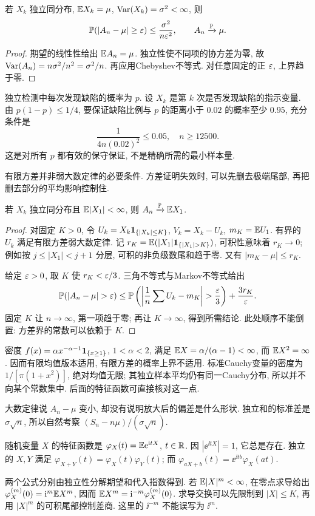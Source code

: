 \begin{theorem}[有限方差弱大数定律]
若 $X_k$ 独立同分布, $\mathbb E X_k=\mu$, $\operatorname{Var}(X_k)=\sigma^2<\infty$, 则
\[\mathbb P(|A_n-\mu|\geq\varepsilon)\leq\frac{\sigma^2}{n\varepsilon^2},\qquad A_n\xrightarrow{\mathbb P}\mu.\]
\end{theorem}
\begin{proof}
期望的线性性给出 $\mathbb E A_n=\mu$. 独立性使不同项的协方差为零, 故 $\operatorname{Var}(A_n)=n\sigma^2/n^2=\sigma^2/n$. 再应用Chebyshev不等式. 对任意固定的正 $\varepsilon$, 上界趋于零.
\end{proof}
\begin{example}
独立检测中每次发现缺陷的概率为 $p$. 设 $X_k$ 是第 $k$ 次是否发现缺陷的指示变量. 由 $p(1-p)\leq1/4$, 要保证缺陷比例与 $p$ 的距离小于 $0.02$ 的概率至少 $0.95$, 充分条件是
\[\frac1{4n(0.02)^2}\leq0.05,\quad n\geq12500.\]
这是对所有 $p$ 都有效的保守保证, 不是精确所需的最小样本量.
\end{example}
有限方差并非弱大数定律的必要条件. 方差证明失效时, 可以先删去极端尾部, 再把删去部分的平均影响控制住.
\begin{theorem}[有限均值弱大数定律]
若 $X_k$ 独立同分布且 $\mathbb E|X_1|<\infty$, 则 $A_n\xrightarrow{\mathbb P}\mathbb E X_1$.
\end{theorem}
\begin{proof}
对固定 $K>0$, 令 $U_k=X_k\mathbf 1_{\{|X_k|\leq K\}}$, $V_k=X_k-U_k$, $m_K=\mathbb E U_1$. 有界的 $U_k$ 满足有限方差弱大数定律. 记 $r_K=\E(|X_1|\ind_{\{|X_1|>K\}})$, 可积性意味着 $r_K\to0$; 例如按 $j\leq|X_1|<j+1$ 分层, 可积的非负级数尾和趋于零. 又有 $|m_K-\mu|\leq r_K$.

给定 $\varepsilon>0$, 取 $K$ 使 $r_K<\varepsilon/3$. 三角不等式与Markov不等式给出
\[\Prob(|A_n-\mu|>\eps)\leq\Prob\left(\left|\frac1n\sum U_k-m_K\right|>\frac\eps3\right)+\frac{3r_K}{\eps}.\]
固定 $K$ 让 $n\to\infty$, 第一项趋于零; 再让 $K\to\infty$, 得到所需结论. 此处顺序不能倒置: 方差界的常数可以依赖于 $K$.
\end{proof}
\begin{example}
密度 $f(x)=\alpha x^{-\alpha-1}\mathbf 1_{\{x\geq1\}}$, $1<\alpha<2$, 满足
$\mathbb E X=\alpha/(\alpha-1)<\infty$, 而 $\mathbb E X^2=\infty$. 因而有限均值版本适用, 有限方差的概率上界不适用. 标准Cauchy变量的密度为 $1/[\pi(1+x^2)]$, 绝对均值无限; 其独立样本平均仍有同一Cauchy分布, 所以并不向某个常数集中. 后面的特征函数可直接核对这一点.
\end{example}

大数定律说 $A_n-\mu$ 变小, 却没有说明放大后的偏差是什么形状. 独立和的标准差是 $\sigma\sqrt n$, 所以自然考察 $(S_n-n\mu)/(\sigma\sqrt n)$.
\begin{definition}
随机变量 $X$ 的特征函数是 $\varphi_X(t)=\mathbb E\mathrm e^{\mathrm i tX}$, $t\in\mathbb R$. 因 $|\ee^{\ii tX}|=1$, 它总是存在. 独立的 $X,Y$ 满足 $\varphi_{X+Y}(t)=\varphi_X(t)\varphi_Y(t)$; 而 $\varphi_{aX+b}(t)=\ee^{\ii tb}\varphi_X(at)$.
\end{definition}
两个公式分别由独立性分解期望和代入指数得到. 若 $\mathbb E|X|^m<\infty$, 在零点求导给出 $\varphi_X^{(m)}(0)=\mathrm i^m\mathbb E X^m$, 因而 $\mathbb E X^m=\mathrm i^{-m}\varphi_X^{(m)}(0)$. 求导交换可以先限制到 $|X|\leq K$, 再用 $|X|^m$ 的可积尾部控制差商. 这里的 $\ii^{-m}$ 不能误写为 $\ii^m$.


